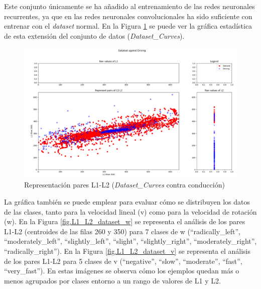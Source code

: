 Este conjunto únicamente se ha añadido al entrenamiento de las redes neuronales recurrentes, ya que en las redes neuronales convolucionales ha sido suficiente con entrenar con el \textit{dataset} normal. En la Figura \ref{fig.L1_L2_dataset_curves} se puede ver la gráfica estadística de esta extensión del conjunto de datos (\textit{Dataset\_Curves}).\\

\begin{figure}
  \begin{center}
    \includegraphics[width=1\textwidth]{figures/Infraestructura/L1_L2_Dataset_Curves.png}
		\caption{Representación pares L1-L2 (\textit{Dataset\_Curves} contra conducción)}
		\label{fig.L1_L2_dataset_curves}
		\end{center}
\end{figure}

La gráfica también se puede emplear para evaluar cómo se distribuyen los datos de las clases, tanto para la velocidad lineal (v) como para la velocidad de rotación (w). En la Figura \ref{fig.L1_L2_dataset_w} se representa el análisis de los pares L1-L2 (centroides de las filas 260 y 350) para 7 clases de w (``radically\_left'', ``moderately\_left'', ``slightly\_left'', ``slight'', ``slightly\_right'', ``moderately\_right'', ``radically\_right''). En la Figura \ref{fig.L1_L2_dataset_v} se representa el análisis de los pares L1-L2 para 5 clases de v (``negative'', ``slow'', ``moderate'', ``fast'', ``very\_fast''). En estas imágenes se observa cómo los ejemplos quedan más o menos agrupados por clases entorno a un rango de valores de L1 y L2. \\

